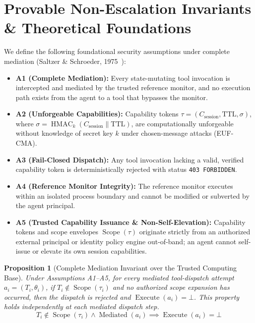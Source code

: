 \documentclass[10pt,journal,compsoc]{IEEEtran}
\begin{document}
\section{Provable Non-Escalation Invariants \& Theoretical Foundations}
We define the following foundational security assumptions under complete mediation (Saltzer \& Schroeder, 1975~\cite{ref_9}):
\begin{itemize}
    \item \textbf{A1 (Complete Mediation):} Every state-mutating tool invocation is intercepted and mediated by the trusted reference monitor, and no execution path exists from the agent to a tool that bypasses the monitor.
    \item \textbf{A2 (Unforgeable Capabilities):} Capability tokens $\tau = (C_{\text{session}}, \text{TTL}, \sigma)$, where $\sigma = \operatorname{HMAC}_k(C_{\text{session}} \parallel \text{TTL})$, are computationally unforgeable without knowledge of secret key $k$ under chosen-message attacks (EUF-CMA).
    \item \textbf{A3 (Fail-Closed Dispatch):} Any tool invocation lacking a valid, verified capability token is deterministically rejected with status \texttt{403 FORBIDDEN}.
    \item \textbf{A4 (Reference Monitor Integrity):} The reference monitor executes within an isolated process boundary and cannot be modified or subverted by the agent principal.
    \item \textbf{A5 (Trusted Capability Issuance \& Non-Self-Elevation):} Capability tokens and scope envelopes $\operatorname{Scope}(\tau)$ originate strictly from an authorized external principal or identity policy engine out-of-band; an agent cannot self-issue or elevate its own session capabilities.
\end{itemize}

\newtheorem{proposition}{Proposition}
\begin{proposition}[Complete Mediation Invariant over the Trusted Computing Base]
Under Assumptions A1--A5, for every mediated tool-dispatch attempt $a_i = (T_i, \theta_i)$, if $T_i \notin \operatorname{Scope}(\tau_i)$ and no authorized scope expansion has occurred, then the dispatch is rejected and $\operatorname{Execute}(a_i) = \bot$. This property holds independently at each mediated dispatch step.
\begin{equation}
T_i \notin \operatorname{Scope}(\tau_i) \land \operatorname{Mediated}(a_i) \implies \operatorname{Execute}(a_i) = \bot
\end{equation}
\end{proposition}
\end{document}
